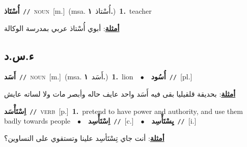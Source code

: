 \documentclass[10pt,a4paper,twoside]{article} %
\begin{document}
\begin{multicols}{2}
{\setlength\topsep{0pt}\textbf{\foreignlanguage{arabic}{أُسْتَاذ}}\ {\color{gray}\texttt{//}\color{black}}\ \textsc{noun}\ [m.]\ \color{gray}(msa. \foreignlanguage{arabic}{أُسْتاذ}~\foreignlanguage{arabic}{\textbf{١.}})\color{black}\ \textbf{1.}~teacher\  \begin{flushright}\color{gray}\foreignlanguage{arabic}{\textbf{\underline{\foreignlanguage{arabic}{أمثلة}}}: أبوي أُسْتاذ عربي بمدرسة الوكالة}\end{flushright}\color{black}} \vspace{2mm}

\vspace{-3mm}
\subsection*{\color{blue}\foreignlanguage{arabic}{ء.س.د}\color{blue}{}} 

{\setlength\topsep{0pt}\textbf{\foreignlanguage{arabic}{أَسَد}}\ {\color{gray}\texttt{//}\color{black}}\ \textsc{noun}\ [m.]\ \color{gray}(msa. \foreignlanguage{arabic}{أَسَد}~\foreignlanguage{arabic}{\textbf{١.}})\color{black}\ \textbf{1.}~lion\ \ $\bullet$\ \ \setlength\topsep{0pt}\textbf{\foreignlanguage{arabic}{أُسُود}}\ {\color{gray}\texttt{//}\color{black}}\ [pl.]\  \begin{flushright}\color{gray}\foreignlanguage{arabic}{\textbf{\underline{\foreignlanguage{arabic}{أمثلة}}}: بحديقة قلقيليا بقى فيه أَسَد واحد عايف حاله وأبصر مات ولا لساته عايش}\end{flushright}\color{black}} \vspace{2mm}

{\setlength\topsep{0pt}\textbf{\foreignlanguage{arabic}{اِسْتَأْسَد}}\ {\color{gray}\texttt{//}\color{black}}\ \textsc{verb}\ [p.]\ \textbf{1.}~pretend to have power and authority, and use them badly towards people\ \ $\bullet$\ \ \setlength\topsep{0pt}\textbf{\foreignlanguage{arabic}{اِسْتَأْسِد}}\ {\color{gray}\texttt{//}\color{black}}\ [c.]\ \ $\bullet$\ \ \setlength\topsep{0pt}\textbf{\foreignlanguage{arabic}{يِسْتَأْسِد}}\ {\color{gray}\texttt{//}\color{black}}\ [i.]\  \begin{flushright}\color{gray}\foreignlanguage{arabic}{\textbf{\underline{\foreignlanguage{arabic}{أمثلة}}}: أنت جاي تِسْتَأسِد علينا وتستقوي على النساوين؟}\end{flushright}\color{black}} \vspace{2mm}


\end{multicols}
\end{document}
